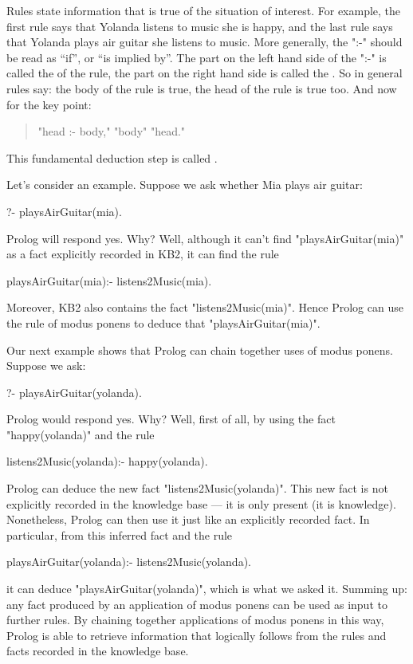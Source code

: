Rules state information that is  true of the
situation of interest.  For example, the first rule says that Yolanda
listens to music  she is happy, and the last rule says
that Yolanda plays air guitar  she listens to music. More
generally, the ":-" should be read as ``if'', or ``is implied by''.
The part on the left hand side of the ":-" is called the 
of the rule, the part on the right hand side is called the
. So in general rules say:  the body of the
rule is true,  the head of the rule is true too.  And
now for the key point:
\begin{quote}
"head :- body,"  "body"
 "head."
\end{quote}
This fundamental deduction step is
called .

Let's consider an example. Suppose we ask whether Mia plays air
guitar:
\begin{LPNcodedisplay}
?- playsAirGuitar(mia).
\end{LPNcodedisplay}
Prolog will respond yes. Why?  Well, although it can't find
"playsAirGuitar(mia)" as a fact explicitly recorded in KB2, it can find the
rule
\begin{LPNcodedisplay}
playsAirGuitar(mia):- listens2Music(mia).
\end{LPNcodedisplay}
Moreover, KB2 also contains the fact "listens2Music(mia)".  Hence
Prolog can use the rule of modus ponens to deduce that
"playsAirGuitar(mia)".

Our next example shows that Prolog can chain together uses of modus
ponens. Suppose we ask:
\begin{LPNcodedisplay}
?- playsAirGuitar(yolanda).
\end{LPNcodedisplay}
Prolog would respond yes.  Why? Well, first of all, by using the fact
"happy(yolanda)" and the rule
\begin{LPNcodedisplay}
listens2Music(yolanda):- happy(yolanda).
\end{LPNcodedisplay}
Prolog can deduce the new fact "listens2Music(yolanda)".  This new
fact is not explicitly recorded in the knowledge base --- it is only
 present (it is  knowledge).
Nonetheless, Prolog can then use it just like an explicitly recorded
fact. In particular, from this inferred fact and the rule
\begin{LPNcodedisplay}
playsAirGuitar(yolanda):- listens2Music(yolanda).
\end{LPNcodedisplay}
it can deduce "playsAirGuitar(yolanda)", which is what we asked it.
Summing up: any fact produced by an application of modus ponens can be used as
input to further rules. By chaining together applications of modus ponens in
this way, Prolog is able to retrieve information that logically follows from
the rules and facts recorded in the knowledge base.


